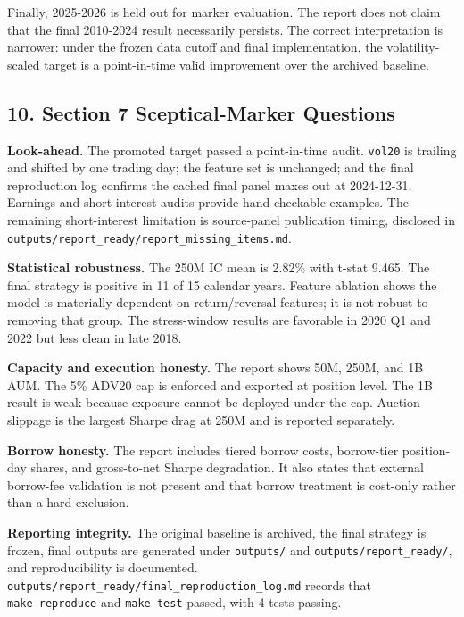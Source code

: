 \documentclass[
]{article}
\begin{document}
Finally, 2025-2026 is held out for marker evaluation. The report does
not claim that the final 2010-2024 result necessarily persists. The
correct interpretation is narrower: under the frozen data cutoff and
final implementation, the volatility-scaled target is a point-in-time
valid improvement over the archived baseline.

\hypertarget{10-section-7-sceptical-marker-questions}{%
\subsection{10. Section 7 Sceptical-Marker
Questions}\label{10-section-7-sceptical-marker-questions}}

\textbf{Look-ahead.} The promoted target passed a point-in-time audit.
\texttt{vol20} is trailing and shifted by one trading day; the feature
set is unchanged; and the final reproduction log confirms the cached
final panel maxes out at 2024-12-31. Earnings and short-interest audits
provide hand-checkable examples. The remaining short-interest limitation
is source-panel publication timing, disclosed in
\texttt{outputs/report\_ready/report\_missing\_items.md}.

\textbf{Statistical robustness.} The 250M IC mean is 2.82\% with t-stat
9.465. The final strategy is positive in 11 of 15 calendar years.
Feature ablation shows the model is materially dependent on
return/reversal features; it is not robust to removing that group. The
stress-window results are favorable in 2020 Q1 and 2022 but less clean
in late 2018.

\textbf{Capacity and execution honesty.} The report shows 50M, 250M, and
1B AUM. The 5\% ADV20 cap is enforced and exported at position level.
The 1B result is weak because exposure cannot be deployed under the cap.
Auction slippage is the largest Sharpe drag at 250M and is reported
separately.

\textbf{Borrow honesty.} The report includes tiered borrow costs,
borrow-tier position-day shares, and gross-to-net Sharpe degradation. It
also states that external borrow-fee validation is not present and that
borrow treatment is cost-only rather than a hard exclusion.

\textbf{Reporting integrity.} The original baseline is archived, the
final strategy is frozen, final outputs are generated under
\texttt{outputs/} and \texttt{outputs/report\_ready/}, and
reproducibility is documented.
\texttt{outputs/report\_ready/final\_reproduction\_log.md} records that
\texttt{make\ reproduce} and \texttt{make\ test} passed, with 4 tests
passing.
\end{document}
